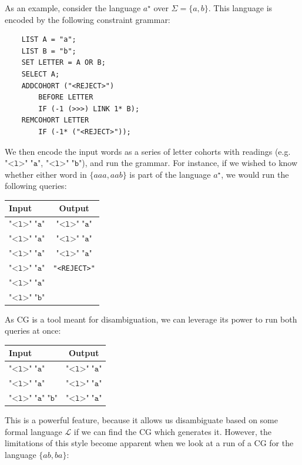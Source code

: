 \documentclass[11pt]{article}
\def\t#1{\texttt{#1}}
\begin{document}
As an example, consider the language $a^\star$ over $\Sigma = \{a,b\}$.
This language is encoded by the following constraint grammar:
\begin{center}
  \begin{Verbatim}
    LIST A = "a";
    LIST B = "b";
    SET LETTER = A OR B;
    SELECT A;
    ADDCOHORT ("<REJECT>")
        BEFORE LETTER 
        IF (-1 (>>>) LINK 1* B);
    REMCOHORT LETTER
        IF (-1* ("<REJECT>"));
  \end{Verbatim}
\end{center}
We then encode the input words as a series of letter cohorts with readings
(e.g.\ \(\t{"<l>"}\;\t{"a"}\), \(\t{"<l>"}\;\t{"b"}\)), and run the grammar.
For instance, if we wished to know whether either word in $\{aaa,aab\}$ is part
of the language $a^\star$, we would run the following queries:
\begin{center}
  \begin{tabular}{l|c}
    \textbf{Input}         & \textbf{Output} \\ \hline
    \(\t{"<l>"}\;\t{"a"}\) & \(\t{"<l>"}\;\t{"a"}\) \\
    \(\t{"<l>"}\;\t{"a"}\) & \(\t{"<l>"}\;\t{"a"}\) \\
    \(\t{"<l>"}\;\t{"a"}\) & \(\t{"<l>"}\;\t{"a"}\) \\ \hline
    \(\t{"<l>"}\;\t{"a"}\) & \t{"<REJECT>"} \\
    \(\t{"<l>"}\;\t{"a"}\) \\
    \(\t{"<l>"}\;\t{"b"}\)
  \end{tabular}
\end{center}
As CG is a tool meant for disambiguation, we can leverage its power to run both
queries at once:
\begin{center}
  \begin{tabular}{l|c}
    \textbf{Input}                  & \textbf{Output} \\ \hline
    \(\t{"<l>"}\;\t{"a"}\)          & \(\t{"<l>"}\;\t{"a"}\) \\
    \(\t{"<l>"}\;\t{"a"}\)          & \(\t{"<l>"}\;\t{"a"}\) \\
    \(\t{"<l>"}\;\t{"a"}\;\t{"b"}\) & \(\t{"<l>"}\;\t{"a"}\)
  \end{tabular}
\end{center}
This is a powerful feature, because it allows us disambiguate based on some
formal language $\mathcal{L}$ if we can find the CG which generates it.
However, the limitations of this style become apparent when we look at a run of
a CG for the language $\{ab,ba\}$:
\end{document}
